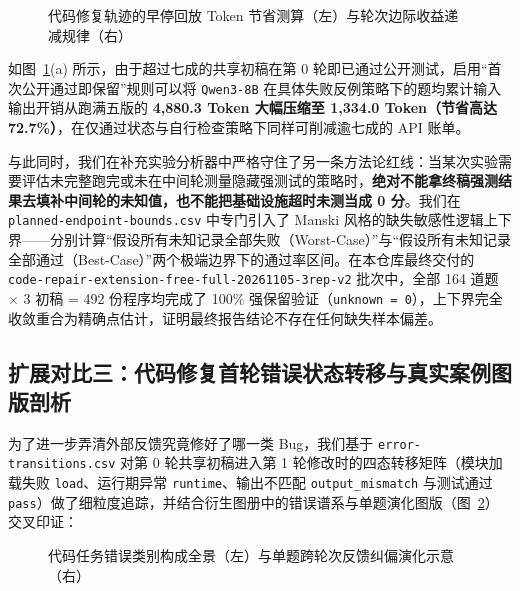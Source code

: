 \begin{figure}[!htbp]
\centering
{}\hfill
{}
\caption{代码修复轨迹的早停回放 Token 节省测算（左）与轮次边际收益递减规律（右）}
\label{fig:stop-budget-atlas}
\end{figure}

如图~\ref{fig:stop-budget-atlas}(a) 所示，由于超过七成的共享初稿在第 0 轮即已通过公开测试，启用“首次公开通过即保留”规则可以将 \texttt{Qwen3-8B} 在具体失败反例策略下的题均累计输入输出开销从跑满五版的 \textbf{4,880.3 Token 大幅压缩至 1,334.0 Token（节省高达 72.7\%）}，在仅通过状态与自行检查策略下同样可削减逾七成的 API 账单。

与此同时，我们在补充实验分析器中严格守住了另一条方法论红线：当某次实验需要评估未完整跑完或未在中间轮测量隐藏强测试的策略时，\textbf{绝对不能拿终稿强测结果去填补中间轮的未知值，也不能把基础设施超时未测当成 0 分}。我们在 \texttt{planned-endpoint-bounds.csv} 中专门引入了 Manski 风格的缺失敏感性逻辑上下界——分别计算“假设所有未知记录全部失败（Worst-Case）”与“假设所有未知记录全部通过（Best-Case）”两个极端边界下的通过率区间。在本仓库最终交付的 \texttt{code-repair-extension-free-full-20261105-3rep-v2} 批次中，全部 164 道题 $\times$ 3 初稿 = 492 份程序均完成了 100\% 强保留验证（\texttt{unknown = 0}），上下界完全收敛重合为精确点估计，证明最终报告结论不存在任何缺失样本偏差。


\subsection{扩展对比三：代码修复首轮错误状态转移与真实案例图版剖析}

为了进一步弄清外部反馈究竟修好了哪一类 Bug，我们基于 \texttt{error-transitions.csv} 对第 0 轮共享初稿进入第 1 轮修改时的四态转移矩阵（模块加载失败 \texttt{load}、运行期异常 \texttt{runtime}、输出不匹配 \texttt{output\_mismatch} 与测试通过 \texttt{pass}）做了细粒度追踪，并结合衍生图册中的错误谱系与单题演化图版（图~\ref{fig:atlas-err-case}）交叉印证：

\begin{figure}[!htbp]
\centering
{}\hfill
{}
\caption{代码任务错误类别构成全景（左）与单题跨轮次反馈纠偏演化示意（右）}
\label{fig:atlas-err-case}
\end{figure}

